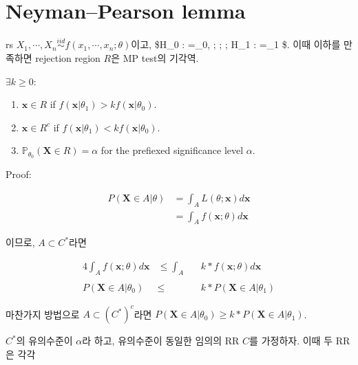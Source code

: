 \documentclass[
]{book}
\providecommand{\tightlist}{%
  \setlength{\itemsep}{0pt}\setlength{\parskip}{0pt}}
\begin{document}
\hypertarget{neymanpearson-lemma}{%
\section{Neyman--Pearson lemma}\label{neymanpearson-lemma}}

rs \(X_1 , \cdots, X_n \overset {iid}{\sim} f(x_1 , \cdots, x_n ; \theta)\)이고, \$H\_0 : \theta=\theta\_0, ; ; ; H\_1 : \theta=\theta\_1 \$. 이때 이하를 만족하면 rejection region \(R\)은 MP test의 기각역.

\(\exists k \ge 0\):

\begin{enumerate}
\def\labelenumi{\arabic{enumi}.}
\tightlist
\item
  \(\pmb x \in R\) if \(f(\pmb x \vert \theta_1) > k f(\pmb x \vert \theta_0)\).
\item
  \(\pmb x \in R^c\) if \(f(\pmb x \vert \theta_1) < k f(\pmb x \vert \theta_0)\).
\item
  \(\mathbb{P}_{\theta_0} \left( \pmb X \in R \right) = \alpha\) for the prefiexed significance level \(\alpha\).
\end{enumerate}

Proof:

\begin{align}

P(\pmb X \in A \vert \theta) &= \int_A L(\theta ; \pmb x) d \pmb x \\

&= \int_A f(\pmb x ; \theta) d \pmb x 

\end{align}

이므로, \(A \subset C^\ast\)라면

\begin{alignat}{4}

\int_A f(\pmb x ; \theta) d \pmb x &\le \int_A && k \ast f(\pmb x ; \theta) d \pmb x \\

\\

P(\pmb X \in A \vert \theta_0) &\le && k \ast P(\pmb X \in A \vert \theta_1)

\end{alignat}

마찬가지 방법으로 \(A \subset \left( C^\ast \right)^c\)라면 \(P(\pmb X \in A \vert \theta_0) \ge k \ast P(\pmb X \in A \vert \theta_1)\).

\(C^\ast\)의 유의수준이 \(\alpha\)라 하고, 유의수준이 동일한 임의의 RR \(C\)를 가정하자. 이때 두 RR은 각각
\end{document}
